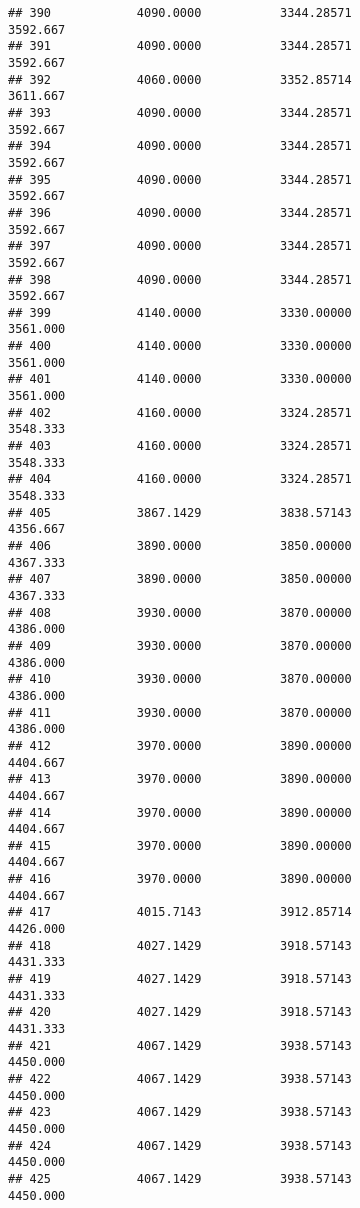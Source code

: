 \documentclass[]{article}
\begin{document}
\begin{verbatim}
## 390            4090.0000           3344.28571                3592.667
## 391            4090.0000           3344.28571                3592.667
## 392            4060.0000           3352.85714                3611.667
## 393            4090.0000           3344.28571                3592.667
## 394            4090.0000           3344.28571                3592.667
## 395            4090.0000           3344.28571                3592.667
## 396            4090.0000           3344.28571                3592.667
## 397            4090.0000           3344.28571                3592.667
## 398            4090.0000           3344.28571                3592.667
## 399            4140.0000           3330.00000                3561.000
## 400            4140.0000           3330.00000                3561.000
## 401            4140.0000           3330.00000                3561.000
## 402            4160.0000           3324.28571                3548.333
## 403            4160.0000           3324.28571                3548.333
## 404            4160.0000           3324.28571                3548.333
## 405            3867.1429           3838.57143                4356.667
## 406            3890.0000           3850.00000                4367.333
## 407            3890.0000           3850.00000                4367.333
## 408            3930.0000           3870.00000                4386.000
## 409            3930.0000           3870.00000                4386.000
## 410            3930.0000           3870.00000                4386.000
## 411            3930.0000           3870.00000                4386.000
## 412            3970.0000           3890.00000                4404.667
## 413            3970.0000           3890.00000                4404.667
## 414            3970.0000           3890.00000                4404.667
## 415            3970.0000           3890.00000                4404.667
## 416            3970.0000           3890.00000                4404.667
## 417            4015.7143           3912.85714                4426.000
## 418            4027.1429           3918.57143                4431.333
## 419            4027.1429           3918.57143                4431.333
## 420            4027.1429           3918.57143                4431.333
## 421            4067.1429           3938.57143                4450.000
## 422            4067.1429           3938.57143                4450.000
## 423            4067.1429           3938.57143                4450.000
## 424            4067.1429           3938.57143                4450.000
## 425            4067.1429           3938.57143                4450.000

\end{verbatim}
\end{document}
